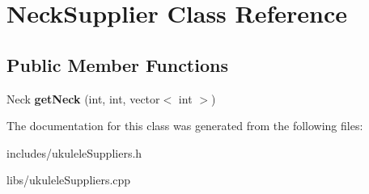 \hypertarget{class_neck_supplier}{}\section{Neck\+Supplier Class Reference}
\label{class_neck_supplier}
\subsection*{Public Member Functions}
\begin{DoxyCompactItemize}
\item 
\hypertarget{class_neck_supplier_a9486ff62b6062d4e9da13c4e7e7c1d5a}{}\label{class_neck_supplier_a9486ff62b6062d4e9da13c4e7e7c1d5a} 
Neck {\bfseries get\+Neck} (int, int, vector$<$ int $>$)
\end{DoxyCompactItemize}


The documentation for this class was generated from the following files\+:\begin{DoxyCompactItemize}
\item 
includes/ukulele\+Suppliers.\+h\item 
libs/ukulele\+Suppliers.\+cpp\end{DoxyCompactItemize}
